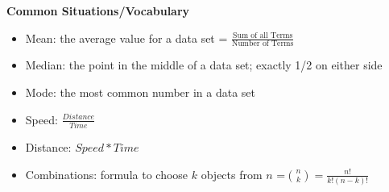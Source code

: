 \documentclass[11pt,letterpaper]{article}
\begin{document}
\vspace{0.4cm}

\begin{minipage}{\textwidth}
     \noindent \textbf{Common Situations/Vocabulary}
     \begin{itemize}
          \item Mean: the average value for a data set = $\frac{\text{Sum of all Terms}}{\text{Number of Terms}}$
          \item Median: the point in the middle of a data set; exactly 1/2 on either side
          \item Mode: the most common number in a data set
          \item Speed: $\frac{Distance}{Time}$
          \item Distance: $Speed * Time$
          \item Combinations: formula to choose $k$ objects from $n$ =${{n}\choose{k}} = \frac{n!}{k!(n-k)!}$
     \end{itemize}
\end{minipage}
\end{document}
